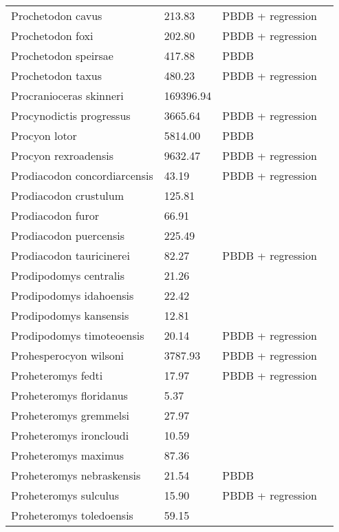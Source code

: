 \documentclass{article}
\begin{document}
\begin{center}
\begin{longtable}{p{} p{} p{} p{}}
    Prochetodon cavus & 213.83 & PBDB + regression &  \\ 
    Prochetodon foxi & 202.80 & PBDB + regression &  \\ 
    Prochetodon speirsae & 417.88 & PBDB &  \\ 
    Prochetodon taxus & 480.23 & PBDB + regression &  \\ 
    Procranioceras skinneri & 169396.94 & \cite{Tomiya2013} &  \\ 
    Procynodictis progressus & 3665.64 & PBDB + regression &  \\ 
    Procyon lotor & 5814.00 & PBDB &  \\ 
    Procyon rexroadensis & 9632.47 & PBDB + regression &  \\ 
    Prodiacodon concordiarcensis & 43.19 & PBDB + regression &  \\ 
    Prodiacodon crustulum & 125.81 & \cite{Lim2001} &  \\ 
    Prodiacodon furor & 66.91 & \cite{Scott1937} &  \\ 
    Prodiacodon puercensis & 225.49 & \cite{Mellett1969} &  \\ 
    Prodiacodon tauricinerei & 82.27 & PBDB + regression &  \\ 
    Prodipodomys centralis & 21.26 & \cite{Becker1981} &  \\ 
    Prodipodomys idahoensis & 22.42 & \cite{Tomiya2013} &  \\ 
    Prodipodomys kansensis & 12.81 & \cite{Tomiya2013} &  \\ 
    Prodipodomys timoteoensis & 20.14 & PBDB + regression &  \\ 
    Prohesperocyon wilsoni & 3787.93 & PBDB + regression &  \\ 
    Proheteromys fedti & 17.97 & PBDB + regression &  \\ 
    Proheteromys floridanus & 5.37 & \cite{Tomiya2013} &  \\ 
    Proheteromys gremmelsi & 27.97 & \cite{Becker1981} &  \\ 
    Proheteromys ironcloudi & 10.59 & \cite{Tomiya2013} &  \\ 
    Proheteromys maximus & 87.36 & \cite{Tomiya2013} &  \\ 
    Proheteromys nebraskensis & 21.54 & PBDB &  \\ 
    Proheteromys sulculus & 15.90 & PBDB + regression &  \\ 
    Proheteromys toledoensis & 59.15 & \cite{Tomiya2013} &  \\ 

\end{longtable}
\end{center}
\end{document}

